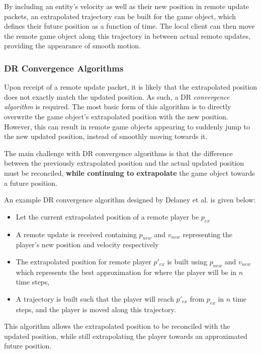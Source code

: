 By including an entity's velocity as well as their new position in remote update packets, an extrapolated trajectory can be built for the game object, which defines their future position as a function of time. The local client can then move the remote game object along this trajectory in between actual remote updates, providing the appearance of smooth motion.   

\subsubsection{DR Convergence Algorithms}

Upon receipt of a remote update packet, it is likely that the extrapolated position does not exactly match the updated position. As such, a DR \textit{convergence algorithm} is required. The most basic form of this algorithm is to directly overwrite the game object's extrapolated position with the new position. However, this can result in remote game objects appearing to suddenly jump to the new updated position, instead of smoothly moving towards it. 

The main challenge with DR convergence algorithms is that the difference between the previously extrapolated position and the actual updated position must be reconciled, \textbf{while continuing to extrapolate} the game object towards a future position.

An example DR convergence algorithm designed by Delaney et al. \cite{dead-reckoning-convergence} is given below:

\begin{itemize}
    \item Let the current extrapolated position of a remote player be $p_{ex}$
    \item A remote update is received containing $p_{new}$ and $v_{new}$ representing the player's new position and velocity respectively
    \item The extrapolated position for remote player $p'_{ex}$ is built using $p_{new}$ and $v_{new}$ which represents the best approximation for where the player will be in $n$ time steps,
    \item A trajectory is built such that the player will reach $p'_{ex}$ from $p_{ex}$ in $n$ time steps, and the player is moved along this trajectory.  
\end{itemize}

This algorithm allows the extrapolated position to be reconciled with the updated position, while still extrapolating the player towards an approximated future position.


